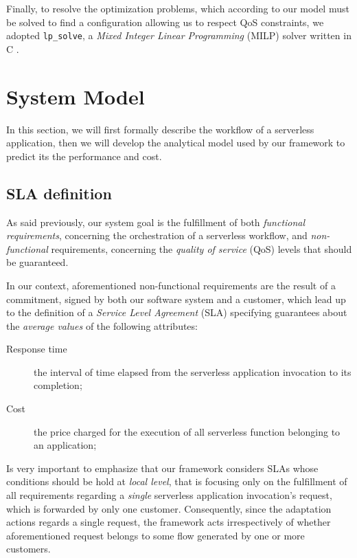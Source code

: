 \documentclass[12pt,a4paper]{report}
\begin{document}
Finally, to resolve the optimization problems, which according to our model must be solved to find a configuration allowing us to respect QoS constraints, we adopted \texttt{lp\_solve}, a \textit{Mixed Integer Linear Programming} (MILP) solver written in C \cite{lpsolve}.

\chapter{System Model}\label{chapterModel}

In this section, we will first formally describe the workflow of a serverless application, then we will develop the analytical model used by our framework to predict its the performance and cost.

\section{SLA definition}

As said previously, our system goal is the fulfillment of both \textit{functional requirements}, concerning the orchestration of a serverless workflow, and \textit{non-functional} requirements, concerning the \textit{quality of service} (QoS) levels that should be guaranteed.

In our context, aforementioned non-functional requirements are the result of a commitment, signed by both our software system and a customer, which lead  up to the definition of a \textit{Service Level Agreement} (SLA) specifying guarantees about the \textit{average values} of the following attributes:

\begin{description}
	\item[Response time] the interval of time elapsed from the
	serverless application invocation to its completion;
	\item[Cost] the price charged for the execution of all serverless function belonging to an application;
\end{description}

Is very important to emphasize that our framework considers SLAs whose conditions should be hold at \textit{local level}, that is focusing only on the fulfillment of all requirements regarding a \textit{single} serverless application invocation's request, which is forwarded by only one customer. Consequently, since the adaptation actions regards a single request, the framework acts irrespectively of whether aforementioned request belongs to some flow generated by one or more customers.
\end{document}
